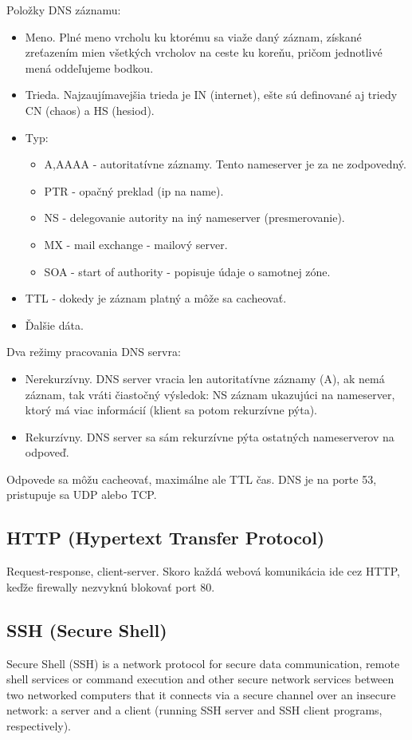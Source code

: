 \documentclass[10pt,a4paper]{article}
\begin{document}
Položky DNS záznamu: 
\begin{itemize}
\item Meno. Plné meno vrcholu ku ktorému sa viaže daný záznam, získané zreťazením mien všetkých vrcholov na ceste ku koreňu, pričom jednotlivé mená oddeľujeme bodkou.
\item Trieda. Najzaujímavejšia trieda je IN (internet), ešte sú definované aj triedy CN (chaos) a HS (hesiod). 
\item Typ:
\begin{itemize}
\item A,AAAA - autoritatívne záznamy. Tento nameserver je za ne zodpovedný. 
\item PTR - opačný preklad (ip na name). 
\item NS - delegovanie autority na iný nameserver (presmerovanie). 
\item MX - mail exchange - mailový server. 
\item SOA - start of authority - popisuje údaje o samotnej zóne. 
\end{itemize}
\item TTL - dokedy je záznam platný a môže sa cacheovať. 
\item Ďalšie dáta. 
\end{itemize}

Dva režimy pracovania DNS servra: 
\begin{itemize}
\item Nerekurzívny. DNS server vracia len autoritatívne záznamy (A), ak nemá záznam, tak vráti čiastočný výsledok: NS záznam ukazujúci na nameserver, ktorý má viac informácií (klient sa potom rekurzívne pýta). 
\item Rekurzívny. DNS server sa sám rekurzívne pýta ostatných nameserverov na odpoveď.
\end{itemize}

Odpovede sa môžu cacheovať, maximálne ale TTL čas. DNS je na porte 53, pristupuje sa UDP alebo TCP. 

\subsection{HTTP (Hypertext Transfer Protocol)}  
Request-response, client-server. Skoro každá webová komunikácia ide cez HTTP, keďže firewally nezvyknú blokovať port 80. 
 
\subsection{SSH (Secure Shell)}   
Secure Shell (SSH) is a network protocol for secure data communication, remote shell services or command execution and other secure network services between two networked computers that it connects via a secure channel over an insecure network: a server and a client (running SSH server and SSH client programs, respectively).
\end{document}
